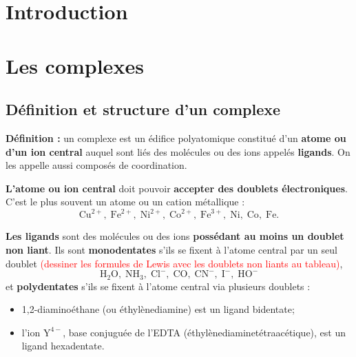 \documentclass[11pt,a4paper]{report}
\begin{document}
\newpage
\section*{Introduction}




\newpage
\section{Les complexes}\label{sec:1}

\subsection{Définition et structure d'un complexe}

\textbf{Définition :} un complexe est un édifice polyatomique constitué d'un \textbf{atome ou d'un ion central} auquel sont liés des molécules ou des ions appelés \textbf{ligands}. On les appelle aussi composés de coordination.

\textbf{L'atome ou ion central} doit pouvoir \textbf{accepter des doublets électroniques}. C'est le plus souvent un atome ou un cation métallique :
\begin{equation}
	\text{Cu}^{2+},\;\text{Fe}^{2+},\;\text{Ni}^{2+},\;\text{Co}^{2+},\;\text{Fe}^{3+},\;
	\text{Ni},\;\text{Co},\;\text{Fe}.
\end{equation}

\textbf{Les ligands} sont des molécules ou des ions \textbf{possédant au moins un doublet non liant}. Ils sont \textbf{monodentates} s'ils se fixent à l'atome central par un seul doublet \textcolor{red}{(dessiner les formules de Lewis avec les doublets non liants au tableau)},
\begin{equation}
	\text{H}_2\text{O},\;\text{NH}_3,\;\text{Cl}^-,\;\text{CO},\;\text{CN}^-,\;
	\text{I}^-,\;\text{HO}^-
\end{equation}
et \textbf{polydentates} s'ils se fixent à l'atome central via plusieurs doublets :
\begin{itemize}
	\item 1,2-diaminoéthane (ou éthylènediamine) est un ligand bidentate;
	\item l'ion $\text{Y}^{4-}$, base conjuguée de l'EDTA (éthylènediaminetétraacétique), est un 				ligand hexadentate.
\end{itemize}
\end{document}
